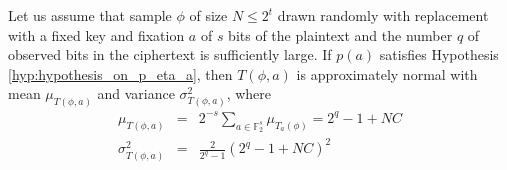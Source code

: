 \begin{theorem} \label{theorem: variable fixation}
Let us assume that sample $\phi$ of size $N \leq 2^t$ drawn randomly with replacement with a fixed key and fixation $a$ of $s$ bits of the plaintext and the number $q$ of observed bits in the ciphertext is sufficiently large. If $p\left(a\right)$ satisfies Hypothesis \ref{hyp:hypothesis_on_p_eta_a}, then $T\left(\phi,a\right)$ is approximately normal with mean $\mu_{T\left(\phi,a\right)}$ and variance $\sigma^2_{T\left(\phi,a\right)}$, where
\begin{eqnarray*}
\mu_{T\left(\phi,a\right)} &=& 2^{-s}\displaystyle\sum_{a \in \mathbb{F}_{2}^{s}}\mu_{T_{a}(\phi)} = 2^{q}-1+NC\\
\sigma^2_{T\left(\phi,a\right)} &=& \frac{2}{2^q - 1}\left(2^q -1 + NC\right)^2
\end{eqnarray*}
\end{theorem}
